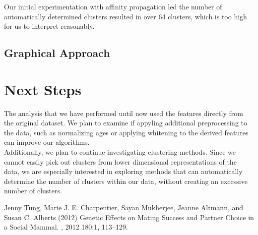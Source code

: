 \documentclass[twoside,twocolumn,paper=letter]{article}
\begin{document}
Our initial experimentation with affinity propagation led the number of
automatically determined clusters resulted in over 64 clusters, which is too
high for us to interpret reasonably.

\subsection{Graphical Approach}


\section{Next Steps}

The analysis that we have performed until now used the features directly from
the original dataset. We plan to examine if appyling additional preprocessing to
the data, such as normalizing ages or applying whitening to the derived features
can improve our algorithms.\\

Additionally, we plan to continue investigating clustering methods. Since we
cannot easily pick out clusters from lower dimensional representations of the
data, we are especially interested in exploring methods that can automatically
determine the number of clusters within our data, without creating an excessive
number of clusters.


\begin{thebibliography}{99} %

  Jenny Tung, Marie J. E. Charpentier, Sayan Mukherjee, Jeanne Altmann, and Susan C. Alberts (2012)
\newblock 
  Genetic Effects on Mating Success and Partner Choice in a Social Mammal.
, 2012 180:1, 113--129.
 
\end{thebibliography}

\end{document}
